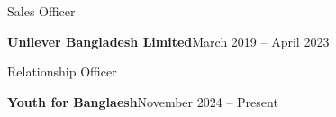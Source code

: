 
{\large\color{emphasis}Sales Officer\par}
\smallskip\normalsize
\textbf{\color{accent}Unilever Bangladesh Limited}\hfill{\small\color{body}March 2019 -- April 2023}\par

\divider

{\large\color{emphasis}Relationship Officer\par}
\smallskip\normalsize
\textbf{\color{accent}Youth for Banglaesh}\hfill{\small\color{body}November 2024 -- Present}\par
\vspace{2mm}
\par
